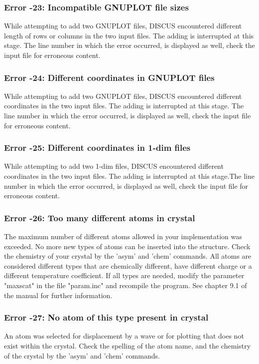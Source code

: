\subsubsection{Error -23: Incompatible GNUPLOT file sizes}
\par
While attempting to add two GNUPLOT files, DISCUS encountered 
different length of rows or columns in the two input files. The 
adding is interrupted at this stage. The line number in which 
the error occurred, is displayed as well, check the input file 
for erroneous content. 
\subsubsection{Error -24: Different coordinates in GNUPLOT files}
\par
While attempting to add two GNUPLOT files, DISCUS encountered 
different coordinates in the two input files. The adding 
is interrupted at this stage. The line number in which the 
error occurred, is displayed as well, check the input file for 
erroneous content. 
\subsubsection{Error -25: Different coordinates in 1-dim files}
\par
While attempting to add two 1-dim files, DISCUS encountered different 
coordinates in the two input files. The adding is interrupted at this 
stage.The line number in which the error occurred, is displayed as 
well, check the input file for erroneous content. 
\subsubsection{Error -26: Too many different atoms in crystal}
\par
The maximum number of different atoms allowed in your implementation 
was exceeded. No more new types of atoms can be inserted into the 
structure. Check the chemistry of your crystal by the 'asym' and 
'chem' commands. All atoms are considered different types that are 
chemically different, have different charge or a different temperature 
coefficient. If all types are needed, modify the parameter "maxscat" 
in the file "param.inc" and recompile the program. See chapter 9.1 
of the manual for further information. 
\subsubsection{Error -27: No atom of this type present in crystal}
\par
An atom was selected for displacement by a wave or for plotting that 
does not exist within the crystal. Check the spelling of the atom 
name, and the chemistry of the crystal by the 'asym' and 'chem' 
commands. 
